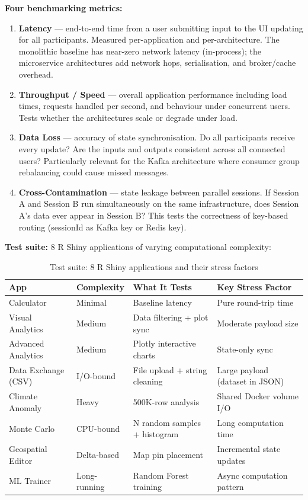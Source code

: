 \documentclass[12pt,a4paper]{article}
\begin{document}
\textbf{Four benchmarking metrics:}

\begin{enumerate}[nosep]
  \item \textbf{Latency} --- end-to-end time from a user submitting input to the UI updating for all participants. Measured per-application and per-architecture. The monolithic baseline has near-zero network latency (in-process); the microservice architectures add network hops, serialisation, and broker/cache overhead.
  \item \textbf{Throughput / Speed} --- overall application performance including load times, requests handled per second, and behaviour under concurrent users. Tests whether the architectures scale or degrade under load.
  \item \textbf{Data Loss} --- accuracy of state synchronisation. Do all participants receive every update? Are the inputs and outputs consistent across all connected users? Particularly relevant for the Kafka architecture where consumer group rebalancing could cause missed messages.
  \item \textbf{Cross-Contamination} --- state leakage between parallel sessions. If Session A and Session B run simultaneously on the same infrastructure, does Session A's data ever appear in Session B? This tests the correctness of key-based routing (sessionId as Kafka key or Redis key).
\end{enumerate}

\textbf{Test suite:} 8 R Shiny applications of varying computational complexity:

\begin{table}[h]
\centering
\small
\begin{tabular}{@{}llll@{}}
\toprule
\textbf{App} & \textbf{Complexity} & \textbf{What It Tests} & \textbf{Key Stress Factor} \\
\midrule
Calculator & Minimal & Baseline latency & Pure round-trip time \\
Visual Analytics & Medium & Data filtering + plot sync & Moderate payload size \\
Advanced Analytics & Medium & Plotly interactive charts & State-only sync \\
Data Exchange (CSV) & I/O-bound & File upload + string cleaning & Large payload (dataset in JSON) \\
Climate Anomaly & Heavy & 500K-row analysis & Shared Docker volume I/O \\
Monte Carlo & CPU-bound & N random samples + histogram & Long computation time \\
Geospatial Editor & Delta-based & Map pin placement & Incremental state updates \\
ML Trainer & Long-running & Random Forest training & Async computation pattern \\
\bottomrule
\end{tabular}
\caption{Test suite: 8 R Shiny applications and their stress factors}
\end{table}
\end{document}
